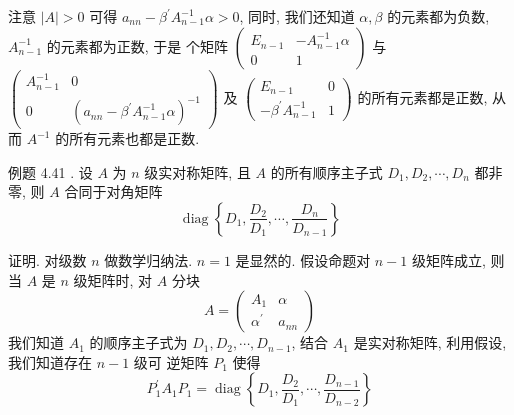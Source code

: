 \documentclass{article}
\begin{document}
注意 $|A|>0$ 可得 $a_{n n}-\beta^{\prime} A_{n-1}^{-1} \alpha>0$, 同时, 我们还知道 $\alpha, \beta$ 的元素都为负数, $A_{n-1}^{-1}$ 的元素都为正数, 于是 个矩阵 $\left(\begin{array}{cc}E_{n-1} & -A_{n-1}^{-1} \alpha \\ 0 & 1\end{array}\right)$ 与 $\left(\begin{array}{cc}A_{n-1}^{-1} & 0 \\ 0 & \left(a_{n n}-\beta^{\prime} A_{n-1}^{-1} \alpha\right)^{-1}\end{array}\right)$ 及 $\left(\begin{array}{cc}E_{n-1} & 0 \\ -\beta^{\prime} A_{n-1}^{-1} & 1\end{array}\right)$ 的所有元素都是正数, 从而 $A^{-1}$ 的所有元素也都是正数.

\vspace{1ex}
{\heiti 例题 4.41 . } {\kaishu 设 $A$ 为 $n$ 级实对称矩阵, 且 $A$ 的所有顺序主子式 $D_{1}, D_{2}, \cdots, D_{n}$ 都非零, 则 $A$ 合同于对角矩阵}
\begin{equation*}
    \operatorname{diag}\left\{D_{1}, \frac{D_{2}}{D_{1}}, \cdots, \frac{D_{n}}{D_{n-1}}\right\}
\end{equation*}

{\heiti 证明.} 对级数 $n$ 做数学归纳法. $n=1$ 是显然的. 假设命题对 $n-1$ 级矩阵成立, 则当 $A$ 是 $n$ 级矩阵时,
对 $A$ 分块
\begin{equation*}
    A=\left(\begin{array}{cc}
        A_{1}           & \alpha  \\
        \alpha^{\prime} & a_{n n}
    \end{array}\right)
\end{equation*}
我们知道 $A_{1}$ 的顺序主子式为 $D_{1}, D_{2}, \cdots, D_{n-1}$, 结合 $A_{1}$ 是实对称矩阵, 利用假设, 我们知道存在 $n-1$ 级可
逆矩阵 $P_{1}$ 使得
\begin{equation*}
    P_{1}^{\prime} A_{1} P_{1}=\operatorname{diag}\left\{D_{1}, \frac{D_{2}}{D_{1}}, \cdots, \frac{D_{n-1}}{D_{n-2}}\right\}
\end{equation*}
\end{document}
